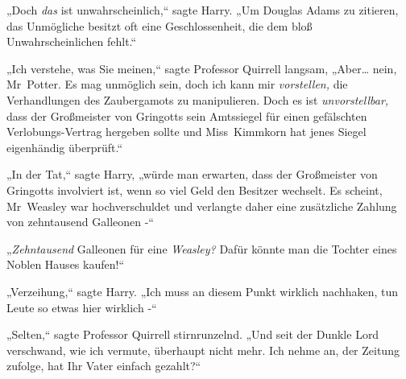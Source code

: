 „Doch \emph{das} ist unwahrscheinlich,“ sagte Harry. „Um Douglas Adams zu zitieren, das Unmögliche besitzt oft eine Geschlossenheit, die dem bloß Unwahrscheinlichen fehlt.“

„Ich verstehe, was Sie meinen,“ sagte Professor Quirrell langsam, „Aber… nein, Mr~Potter. Es mag unmöglich sein, doch ich kann mir \emph{vorstellen,} die Verhandlungen des Zaubergamots zu manipulieren. Doch es ist \emph{unvorstellbar,} dass der Großmeister von Gringotts sein Amtssiegel für einen gefälschten Verlobungs-Vertrag hergeben sollte und Miss~Kimmkorn hat jenes Siegel eigenhändig überprüft.“

„In der Tat,“ sagte Harry, „würde man erwarten, dass der Großmeister von Gringotts involviert ist, wenn so viel Geld den Besitzer wechselt. Es scheint, Mr~Weasley war hochverschuldet und verlangte daher eine zusätzliche Zahlung von zehntausend Galleonen -“

„\emph{Zehntausend} Galleonen für eine \emph{Weasley?} Dafür könnte man die Tochter eines Noblen Hauses kaufen!“

„Verzeihung,“ sagte Harry. „Ich muss an diesem Punkt wirklich nachhaken, tun Leute so etwas hier wirklich -“

„Selten,“ sagte Professor Quirrell stirnrunzelnd. „Und seit der Dunkle Lord verschwand, wie ich vermute, überhaupt nicht mehr. Ich nehme an, der Zeitung zufolge, hat Ihr Vater einfach gezahlt?“


